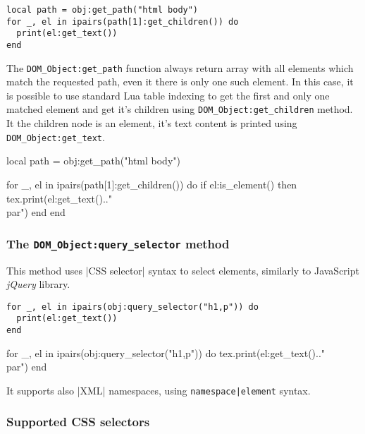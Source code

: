 \documentclass{ltxdoc}
\begin{document}
\begin{verbatim}
local path = obj:get_path("html body")
for _, el in ipairs(path[1]:get_children()) do
  print(el:get_text())
end
\end{verbatim}

The \verb|DOM_Object:get_path| function always return array with all elements
which match the requested path, even it there is only one such element. In this
case, it is possible to use standard Lua table indexing to get the first and
only one matched element and get it's children using
\verb|DOM_Object:get_children| method. It the children node is an element, it's
text content is printed using \verb|DOM_Object:get_text|.



\begin{framed}
  \begin{luacode*}
local path = obj:get_path("html body")

for _, el in ipairs(path[1]:get_children()) do
  if el:is_element() then
    tex.print(el:get_text().."\\par")
  end
end
  \end{luacode*}
\end{framed}

\subsubsection{The \texttt{DOM\_Object:query\_selector} method}

This method uses |CSS selector| syntax to select elements, similarly to JavaScript \textit{jQuery} library.

\begin{verbatim}
for _, el in ipairs(obj:query_selector("h1,p")) do
  print(el:get_text())
end
\end{verbatim}


\begin{framed}
  \begin{luacode*}
for _, el in ipairs(obj:query_selector("h1,p")) do
  tex.print(el:get_text().."\\par")
end
  \end{luacode*}
\end{framed}

It supports also |XML| namespaces, using \verb_namespace|element_ syntax.

\subsubsection{Supported CSS selectors}\label{sec:css_selectors}
\end{document}
